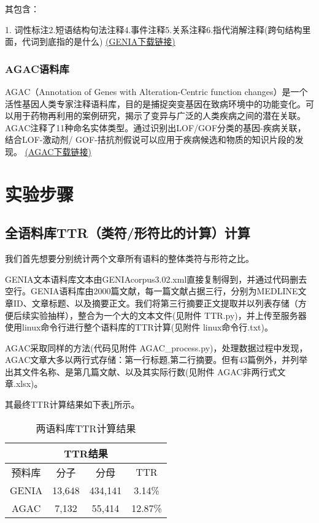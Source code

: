 \documentclass{article}
\begin{document}
其包含：

1. 词性标注2.短语结构句法注释4.事件注释5.关系注释6.指代消解注释(跨句结构里面，代词到底指的是什么)
\href{http://www.nactem.ac.uk/GENIA/current/GENIA-corpus/Part-of-speech/GENIAcorpus3.02p.tgz}{\underline{(GENIA下载链接)}}
	\subsubsection{AGAC语料库}
AGAC（Annotation of Genes with Alteration-Centric function changes）是一个活性基因人类专家注释语料库，目的是捕捉突变基因在致病环境中的功能变化。可以用于药物再利用的案例研究，揭示了变异与广泛的人类疾病之间的潜在关联。AGAC注释了11种命名实体类型。通过识别出LOF/GOF分类的基因-疾病关联，结合LOF-激动剂/ GOF-拮抗剂假说可以应用于疾病候选和物质的知识片段的发现。
\href{http://pubannotation.org/collections/AGAC}{\underline{(AGAC下载链接)}}

\section{实验步骤}
	\subsection{全语料库TTR（类符/形符比的计算）计算}
我们首先想要分别统计两个文章所有语料的整体类符与形符之比。

GENIA文本语料库文本由GENIAcorpus3.02.xml直接复制得到，并通过代码删去空行。GENIA语料库由2000篇文献，每一篇文献占据三行，分别为MEDLINE文章ID、文章标题、以及摘要正文。我们将第三行摘要正文提取并以列表存储（方便后续实验抽样），整合为一个大的文本文件(见附件 TTR.py)，并上传至服务器使用linux命令行进行整个语料库的TTR计算(见附件 linux命令行.txt)。

AGAC采取同样的方法(代码见附件 AGAC\_process.py)，处理数据过程中发现，AGAC文章大多以两行式存储：第一行标题,第二行摘要。但有43篇例外，并列举出其文件名称、是第几篇文献、以及其实际行数(见附件 AGAC非两行式文章.xlsx)。

其最终TTR计算结果如下表\ref{TTRresult}所示。


\begin{table}[h]
\centering
\begin{tabular}{|c|c|c|c|}
\hline
\multicolumn{4}{|c|}{TTR结果}        \\ \hline
预料库   & 分子     & 分母      & TTR     \\ \hline
GENIA & 13,648 & 434,141 & 3.14\%  \\ \hline
AGAC  & 7,132  & 55,414  & 12.87\% \\ \hline
\end{tabular}
\caption{两语料库TTR计算结果}
\label{TTRresult}
\end{table}
\end{document}
